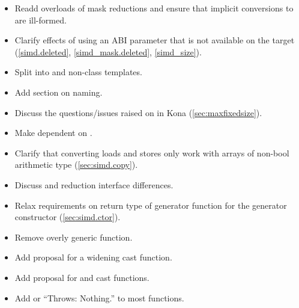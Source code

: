 \begin{itemize}
  \item Readd \bool overloads of mask reductions and ensure that implicit conversions to \bool are ill-formed.
  \item Clarify effects of using an ABI parameter that is not available on the target (\ref{simd.deleted}, \ref{simd_mask.deleted}, \ref{simd_size}).
  \item Split \whereexpression into \const and non-\const class templates.
  \item Add section on naming.
  \item Discuss the questions/issues raised on  in Kona (\autoref{sec:maxfixedsize}).
  \item Make  dependent on .
  \item Clarify that converting loads and stores only work with arrays of non-bool arithmetic type (\ref{sec:simd.copy}).
  \item Discuss \mask and  reduction interface differences.
  \item Relax requirements on return type of generator function for the generator constructor (\ref{sec:simd.ctor}).
  \item Remove overly generic  function.
  \item Add proposal for a widening cast function.
  \item Add proposal for  and  cast functions.
  \item Add  or “Throws: Nothing.” to most functions.


\end{itemize}
